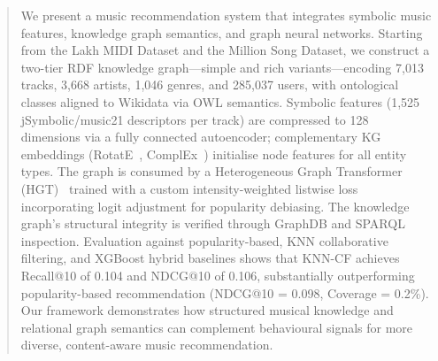 \begin{abstract}
We present a music recommendation system that integrates symbolic music features, knowledge graph semantics, and graph neural networks. Starting from the Lakh MIDI Dataset and the Million Song Dataset, we construct a two-tier RDF knowledge graph---simple and rich variants---encoding 7,013 tracks, 3,668 artists, 1,046 genres, and 285,037 users, with ontological classes aligned to Wikidata via OWL semantics. Symbolic features (1,525 jSymbolic/music21 descriptors per track) are compressed to 128 dimensions via a fully connected autoencoder; complementary KG embeddings (RotatE~\cite{sun2019rotate}, ComplEx~\cite{trouillon2016complex}) initialise node features for all entity types. The graph is consumed by a Heterogeneous Graph Transformer (HGT)~\cite{hu2020hgt} trained with a custom intensity-weighted listwise loss incorporating logit adjustment for popularity debiasing. The knowledge graph's structural integrity is verified through GraphDB and SPARQL inspection. Evaluation against popularity-based, KNN collaborative filtering, and XGBoost hybrid baselines shows that KNN-CF achieves Recall@10 of 0.104 and NDCG@10 of 0.106, substantially outperforming popularity-based recommendation (NDCG@10 = 0.098, Coverage = 0.2\%). Our framework demonstrates how structured musical knowledge and relational graph semantics can complement behavioural signals for more diverse, content-aware music recommendation.
\end{abstract}
